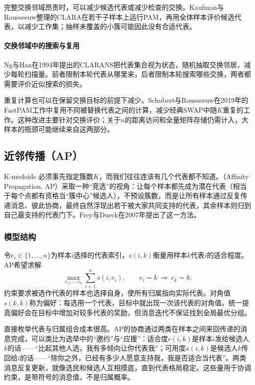 完整交换邻域昂贵时，可以减少候选代表或减少检查的交换。Kaufman与Rousseeuw整理的CLARA在若干子样本上运行PAM，再用全体样本评价候选代表，以减少工作集；抽样未覆盖的小簇可能因此没有合适代表。

\paragraph{交换邻域中的搜索与复用}

Ng与Han在1994年提出的CLARANS把代表集合视为状态，随机抽取交换邻居，减少每轮扫描量。前者限制本轮代表从哪里来，后者限制本轮搜索哪些交换，两者都需要评价近似搜索的损失。

重复计算也可以在保留交换目标的前提下减少。Schubert与Rousseeuw在2019年的FastPAM工作中复用不同被替换代表之间的计算，减少经典SWAP中随$K$重复的工作。这种改进主要针对交换评价；关于$n$的距离访问和全量矩阵存储仍需计入，大样本的瓶颈可能继续来自这两部分。
\subsection{近邻传播（AP）}
\label{sec:clustering-affinity-propagation}

K-medoids 必须事先指定簇数$K$，而我们往往连该有几个代表都不知道。（Affinity Propagation, AP）采取一种“竞选”的视角：让每个样本都先成为潜在代表（相当于每个点都有资格当“簇中心”候选人），不预设簇数，而是让所有样本通过反复传递消息、彼此协商，最终自然浮现出若干被大家共同支持的代表，其余样本则归到自己最支持的代表门下。Frey与Dueck在2007年提出了这一方法。

\subsubsection{模型结构}

令$e_i\in\{1,\ldots,n\}$为样本$i$选择的代表索引，$s(i,k)$衡量用样本$k$代表$i$的适合程度。AP希望求解
\[
 \max_{e_1,\ldots,e_n}\sum_{i=1}^n s(i,e_i),
 \qquad e_i=k\ \Longrightarrow\ e_k=k.
\]
约束要求被选作代表的样本也选择自身，使所有归属指向实际代表。对角值$s(k,k)$称为偏好：每选用一个代表，目标中就出现一次该代表的对角值。统一提高偏好会在目标中增加对较多代表的奖励，但消息迭代不保证找到全局最优分组。

直接枚举代表与归属组合成本很高。AP的协商通过两类在样本之间来回传递的消息完成，可以类比为选举中的“邀约”与“应援”：适合度$r(i,k)$是样本$i$发给候选人$k$的话——“比起其他人选，我有多倾向让你代表我”；可用度$a(i,k)$是候选人$k$传回给$i$的话——“除你之外，已经有多少人愿意支持我，我是否适合当代表”。两类消息反复更新，就像选民和候选人互相摸底，直到代表格局稳定。这些量用于协调约束，是带符号的消息值，不是归属概率。

